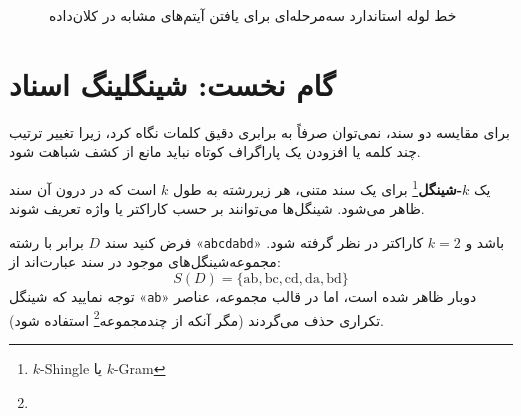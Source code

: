 \begin{figure}[H]
\centering
{}
\caption{خط لوله استاندارد سه‌مرحله‌ای برای یافتن آیتم‌های مشابه در کلان‌داده}
\label{fig:lsh-pipeline}
\end{figure}

\section{گام نخست: شینگلینگ اسناد}
برای مقایسه دو سند، نمی‌توان صرفاً به برابری دقیق کلمات نگاه کرد، زیرا تغییر ترتیب چند کلمه یا افزودن یک پاراگراف کوتاه نباید مانع از کشف شباهت شود.

\begin{definition}
یک \textbf{$k$-شینگل}\footnote{$k$-Shingle یا $k$-Gram} برای یک سند متنی، هر زیررشته به طول $k$ است که در درون آن سند ظاهر می‌شود. شینگل‌ها می‌توانند بر حسب کاراکتر یا واژه تعریف شوند.
\end{definition}

\begin{example}
فرض کنید سند $D$ برابر با رشته «\texttt{abcdabd}» باشد و $k = 2$ کاراکتر در نظر گرفته شود. مجموعه‌شینگل‌های موجود در سند عبارت‌اند از:
\begin{equation}
S(D) = \{\text{ab}, \text{bc}, \text{cd}, \text{da}, \text{bd}\}
\end{equation}
توجه نمایید که شینگل «\texttt{ab}» دوبار ظاهر شده است، اما در قالب مجموعه، عناصر تکراری حذف می‌گردند (مگر آنکه از چندمجموعه\footnote{} استفاده شود).
\end{example}

